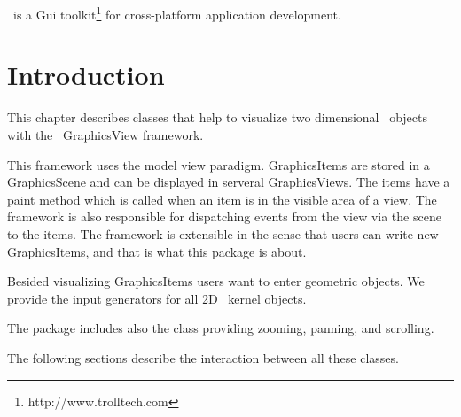 

\qt\ is a {\sc Gui} toolkit\footnote{http://www.trolltech.com} for
cross-platform application development. 

\section{Introduction}

This chapter describes classes that help to visualize two dimensional \cgal\ objects
with the \qt\ GraphicsView framework.

This framework uses the model view paradigm. GraphicsItems are stored in a 
GraphicsScene and can be displayed in serveral GraphicsViews. The items 
have a paint method which is called when an item is in the visible area of a view.
The framework is also responsible for dispatching events from the view
via the scene to the items. The framework is extensible in the sense
that users can write new GraphicsItems, and that is what this package is
about. 

Besided visualizing GraphicsItems users want to enter geometric objects.
We provide the input generators for all 2D \cgal\ kernel objects.

The package includes also the class  providing zooming,
panning, and scrolling.


The following sections describe the interaction between all these classes.
